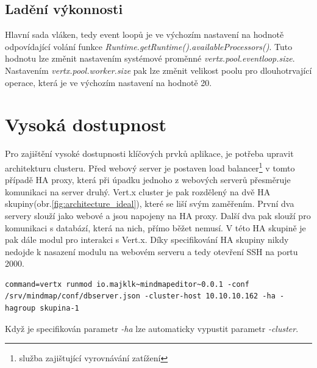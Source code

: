 \subsection{Ladění výkonnosti}\label{sub:performenceScale}

Hlavní sada vláken, tedy event loopů je ve výchozím nastavení na hodnotě odpovídající volání funkce \emph{Runtime.getRuntime().availableProcessors()}. Tuto hodnotu lze změnit nastavením systémové proměnné \emph{vertx.pool.eventloop.size}. Nastavením \emph{vertx.pool.worker.size} pak lze změnit velikost poolu pro dlouhotrvající operace, která je ve výchozím nastavení na hodnotě 20.

\section{Vysoká dostupnost}

Pro zajištění vysoké dostupnosti klíčových prvků aplikace, je potřeba upravit architekturu clusteru. Před webový server je postaven load balancer\footnote{služba zajištující vyrovnávání zatížení} v tomto případě HA proxy, která při úpadku jednoho z webových serverů přesměruje komunikaci na server druhý. Vert.x cluster je pak rozdělený na dvě HA skupiny(obr.\ref{fig:architecture_ideal}), které se liší svým zaměřením. První dva servery slouží jako webové a jsou napojeny na HA proxy. Další dva pak slouží pro komunikaci s databází, která na nich, přímo běžet nemusí. V této HA skupině je pak dále modul pro interakci s Vert.x. Díky specifikování HA skupiny nikdy nedojde k nasazení modulu na webovém serveru a tedy otevření SSH na portu 2000.

\begin{lstlisting}[caption=Vysoká dostupnost na databázovém serveru 2]
command=vertx runmod io.majklk~mindmapeditor~0.0.1 -conf /srv/mindmap/conf/dbserver.json -cluster-host 10.10.10.162 -ha -hagroup skupina-1
\end{lstlisting}

Když je specifikován parametr \emph{-ha} lze automaticky vypustit parametr \emph{-cluster}.

